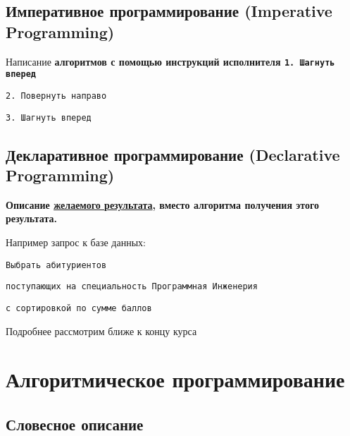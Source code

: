     \subsection{Императивное программирование (Imperative Programming)}
    \begin{frame}
      Написание \bfseries алгоритмов \mdseries с помощью \bfseries инструкций исполнителя\mdseries
        \vspace{1cm}
        \texttt{1. Шагнуть вперед}

        \texttt{2. Повернуть направо}

        \texttt{3. Шагнуть вперед}
        \vspace{1cm}
    \end{frame}

    \subsection{Декларативное программирование (Declarative Programming)}
    \begin{frame}
        \bfseries Описание \underline{желаемого результата}, вместо алгоритма получения этого результата.\mdseries\linebreak
        \vspace{1cm}

        Например запрос к базе данных:

        \vspace{0.5cm}
        \texttt{Выбрать абитуриентов}

        \texttt{поступающих на специальность Программная Инженерия}

        \texttt{с сортировкой по сумме баллов}
        \vspace{1cm}

        Подробнее рассмотрим ближе к концу курса
    \end{frame}


  \section{Алгоритмическое программирование}

    \subsection{Словесное описание}


